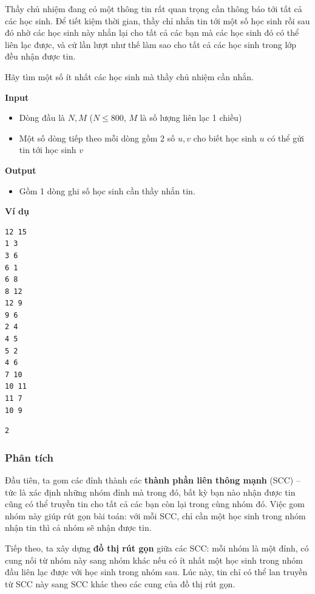 \documentclass{article}
\begin{document}
Thầy chủ nhiệm đang có một thông tin rất quan trọng cần thông báo tới tất cả các học sinh. Để tiết kiệm thời gian, thầy chỉ nhắn tin tới một số học sinh rồi sau đó nhờ các học sinh này nhắn lại cho tất cả các bạn mà các học sinh đó có thể liên lạc được, và cứ lần lượt như thế làm sao cho tất cả các học sinh trong lớp đều nhận được tin.

Hãy tìm một số ít nhất các học sinh mà thầy chủ nhiệm cần nhắn.

\textbf{Input}
\begin{itemize}
    \item Dòng đầu là $N, M$ ($N \leq 800$, $M$ là số lượng liên lạc 1 chiều)
    \item Một số dòng tiếp theo mỗi dòng gồm 2 số $u, v$ cho biết học sinh $u$ có thể gửi tin tới học sinh $v$
\end{itemize}

\textbf{Output} 
\begin{itemize}
    \item Gồm 1 dòng ghi số học sinh cần thầy nhắn tin.
\end{itemize}


\textbf{Ví dụ}

\begin{lstlisting}[caption={Input}]
12 15
1 3
3 6
6 1
6 8
8 12
12 9
9 6
2 4
4 5
5 2
4 6
7 10
10 11
11 7
10 9
\end{lstlisting}

\begin{lstlisting}[caption={Output}]
2
\end{lstlisting}

\subsubsection*{Phân tích}

Đầu tiên, ta gom các đỉnh thành các \textbf{thành phần liên thông mạnh} (SCC) -- tức là xác định những nhóm đỉnh mà trong đó, bất kỳ bạn nào nhận được tin cũng có thể truyền tin cho tất cả các bạn còn lại trong cùng nhóm đó. Việc gom nhóm này giúp rút gọn bài toán: với mỗi SCC, chỉ cần một học sinh trong nhóm nhận tin thì cả nhóm sẽ nhận được tin.

Tiếp theo, ta xây dựng \textbf{đồ thị rút gọn} giữa các SCC: mỗi nhóm là một đỉnh, có cung nối từ nhóm này sang nhóm khác nếu có ít nhất một học sinh trong nhóm đầu liên lạc được với học sinh trong nhóm sau. Lúc này, tin chỉ có thể lan truyền từ SCC này sang SCC khác theo các cung của đồ thị rút gọn.
\end{document}
